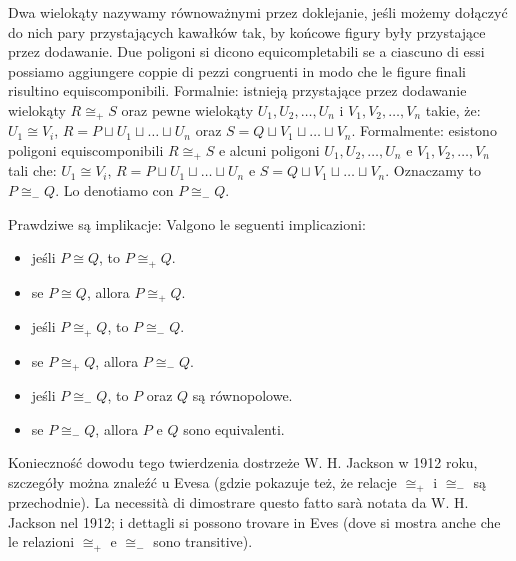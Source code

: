 \begin{definition}
    Dwa wielokąty nazywamy równoważnymi przez doklejanie, jeśli możemy dołączyć do nich pary przystających kawałków tak, by końcowe figury były przystające przez dodawanie. %
    Due poligoni si dicono equicompletabili se a ciascuno di essi possiamo aggiungere coppie di pezzi congruenti in modo che le figure finali risultino equiscomponibili. %
    Formalnie: istnieją przystające przez dodawanie wielokąty $R \cong_+ S$ oraz pewne wielokąty $U_1, U_2, \ldots, U_n$ i $V_1, V_2, \ldots, V_n$ takie, że: $U_1 \cong V_i$, $R = P \sqcup U_1 \sqcup \ldots \sqcup U_n$ oraz $S = Q \sqcup V_1 \sqcup \ldots \sqcup V_n$. %
    Formalmente: esistono poligoni equiscomponibili $R \cong_+ S$ e alcuni poligoni $U_1, U_2, \ldots, U_n$ e $V_1, V_2, \ldots, V_n$ tali che: $U_1 \cong V_i$, $R = P \sqcup U_1 \sqcup \ldots \sqcup U_n$ e $S = Q \sqcup V_1 \sqcup \ldots \sqcup V_n$. %
    Oznaczamy to $P \cong_- Q$. %
    Lo denotiamo con $P \cong_- Q$. %
\end{definition}

\begin{proposition}
    \label{congruent_addition_subtraction}%
    Prawdziwe są implikacje: %
    Valgono le seguenti implicazioni: %
    \begin{itemize}
        \item jeśli $P \cong Q$, to $P \cong_+ Q$. %
        \item se $P \cong Q$, allora $P \cong_+ Q$. %
        \item jeśli $P \cong_+ Q$, to $P \cong_- Q$. %
        \item se $P \cong_+ Q$, allora $P \cong_- Q$. %
        \item jeśli $P \cong_- Q$, to $P$ oraz $Q$ są równopolowe. %
        \item se $P \cong_- Q$, allora $P$ e $Q$ sono equivalenti. %
    \end{itemize}
\end{proposition}

Konieczność dowodu tego twierdzenia dostrzeże W. H. Jackson w 1912 roku, szczegóły można znaleźć u Evesa \cite[s. 198, 199]{eves1_1972} (gdzie pokazuje też, że relacje $\cong_+$ i $\cong_-$ są przechodnie). %
La necessità di dimostrare questo fatto sarà notata da W. H. Jackson nel 1912; i dettagli si possono trovare in Eves \cite[p. 198, 199]{eves1_1972} (dove si mostra anche che le relazioni $\cong_+$ e $\cong_-$ sono transitive). %

